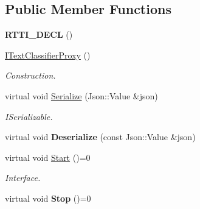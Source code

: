 \subsection*{Public Member Functions}
\begin{DoxyCompactItemize}
\item 
\mbox{\label{class_i_text_classifier_proxy_aa6bd93ffc9b95c5f4e645ad65cfaaf46}} 
{\bfseries R\+T\+T\+I\+\_\+\+D\+E\+CL} ()
\item 
\mbox{\label{class_i_text_classifier_proxy_a50daf9fee4f67bd86f0fe0a1f1c32704}} 
\hyperlink{class_i_text_classifier_proxy_a50daf9fee4f67bd86f0fe0a1f1c32704}{I\+Text\+Classifier\+Proxy} ()
\begin{DoxyCompactList}\small\item\em Construction. \end{DoxyCompactList}\item 
\mbox{\label{class_i_text_classifier_proxy_a6a361fc881d655ffffedeb4e6335bbbc}} 
virtual void \hyperlink{class_i_text_classifier_proxy_a6a361fc881d655ffffedeb4e6335bbbc}{Serialize} (Json\+::\+Value \&json)
\begin{DoxyCompactList}\small\item\em I\+Serializable. \end{DoxyCompactList}\item 
\mbox{\label{class_i_text_classifier_proxy_a434c874f149d0b5aa9a1dbaf1cc2775f}} 
virtual void {\bfseries Deserialize} (const Json\+::\+Value \&json)
\item 
\mbox{\label{class_i_text_classifier_proxy_adca860efc59b87cbaf24330727e50366}} 
virtual void \hyperlink{class_i_text_classifier_proxy_adca860efc59b87cbaf24330727e50366}{Start} ()=0
\begin{DoxyCompactList}\small\item\em Interface. \end{DoxyCompactList}\item 
\mbox{\label{class_i_text_classifier_proxy_aef8fe5a13a755b4dd48423cbdb9de98c}} 
virtual void {\bfseries Stop} ()=0
\item 
\mbox{\label{class_i_text_classifier_proxy_adb6284ae8311e8f6f840c9c951ed20e9}} 

\end{DoxyCompactItemize}

